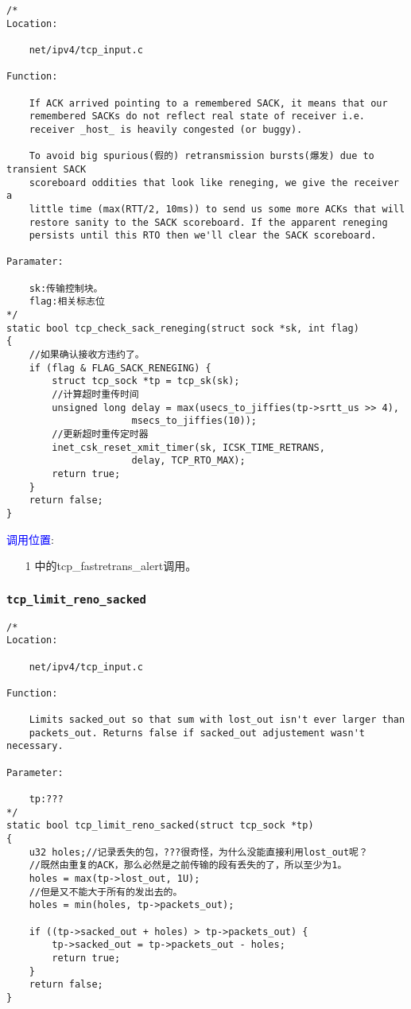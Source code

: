 \begin{verbatim}
/*
Location:

    net/ipv4/tcp_input.c

Function:

    If ACK arrived pointing to a remembered SACK, it means that our
    remembered SACKs do not reflect real state of receiver i.e.
    receiver _host_ is heavily congested (or buggy).

    To avoid big spurious(假的) retransmission bursts(爆发) due to transient SACK
    scoreboard oddities that look like reneging, we give the receiver a
    little time (max(RTT/2, 10ms)) to send us some more ACKs that will
    restore sanity to the SACK scoreboard. If the apparent reneging
    persists until this RTO then we'll clear the SACK scoreboard.

Paramater:

    sk:传输控制块。
    flag:相关标志位
*/
static bool tcp_check_sack_reneging(struct sock *sk, int flag)
{
    //如果确认接收方违约了。
    if (flag & FLAG_SACK_RENEGING) {
        struct tcp_sock *tp = tcp_sk(sk);
        //计算超时重传时间
        unsigned long delay = max(usecs_to_jiffies(tp->srtt_us >> 4),
                      msecs_to_jiffies(10));
        //更新超时重传定时器  
        inet_csk_reset_xmit_timer(sk, ICSK_TIME_RETRANS,
                      delay, TCP_RTO_MAX);
        return true;
    }
    return false;
}
\end{verbatim}

        \textcolor{blue}{调用位置}:
            \begin{enumerate}
                \item[1]        \label{CongestionDeal:tcp_fastretrans_alert}中的tcp\_fastretrans\_alert调用。
            \end{enumerate}
        
        \subsubsection{\texttt{tcp_limit_reno_sacked}}
\begin{verbatim}
/* 
Location:

    net/ipv4/tcp_input.c

Function:

    Limits sacked_out so that sum with lost_out isn't ever larger than
    packets_out. Returns false if sacked_out adjustement wasn't necessary.

Parameter:

    tp:???
*/
static bool tcp_limit_reno_sacked(struct tcp_sock *tp)
{
    u32 holes;//记录丢失的包，???很奇怪，为什么没能直接利用lost_out呢？
    //既然由重复的ACK，那么必然是之前传输的段有丢失的了，所以至少为1。
    holes = max(tp->lost_out, 1U);
    //但是又不能大于所有的发出去的。
    holes = min(holes, tp->packets_out);

    if ((tp->sacked_out + holes) > tp->packets_out) {
        tp->sacked_out = tp->packets_out - holes;
        return true;
    }
    return false;
}
\end{verbatim}

